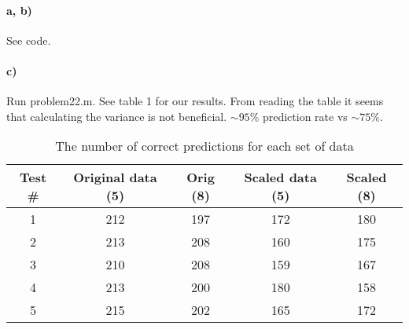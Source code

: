 \documentclass{article}
\begin{document}
\paragraph{a, b)}

See code.

\paragraph{c)}

Run problem22.m. See table 1 for our results. From reading the
table it seems that calculating the variance is not beneficial. $\sim95\%$
prediction rate vs $\sim75\%$.

\begin{table}
  \begin{tabular}{c | c | c | c | c}
    Test \# & Original data (5) & Orig (8) & Scaled data (5) & Scaled (8)\\
    \hline
    1 & 212 & 197 & 172 & 180\\
    2 & 213 & 208 & 160 & 175\\
    3 & 210 & 208 & 159 & 167\\
    4 & 213 & 200 & 180 & 158\\
    5 & 215 & 202 & 165 & 172\\
  \end{tabular}
\caption{The number of correct predictions for each set of data}
\end{table}
\end{document}
